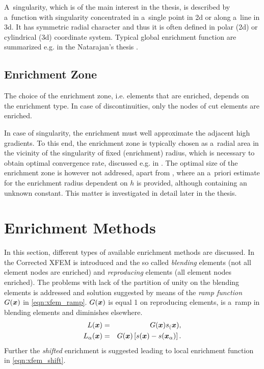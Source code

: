 A~singularity, which is of the main interest in the thesis, is described by a~function with singularity concentrated in a~single point in 2d
or along a~line in 3d. It has symmetric radial character and thus it is often defined in polar (2d) or cylindrical (3d) coordinate system.
Typical global enrichment function are summarized e.g. in the Natarajan's thesis \cite{natarajan_enriched_2011}.


\subsection{Enrichment Zone} \label{sec:glob_enr_zone}
The choice of the enrichment zone, i.e. elements that are enriched, depends on the enrichment type.
In case of discontinuities, only the nodes of cut elements are enriched.

In case of singularity, the enrichment must well approximate the adjacent high gradients.
To this end, the enrichment zone is typically chosen as a~radial area in the vicinity of the singularity
of fixed (enrichment) radius, which is necessary to obtain optimal convergence rate, discussed e.g. in \cite{fries_corrected_2008}.
The optimal size of the enrichment zone is however not addresed, apart from \cite{gupta_enr_zone_2016}, where
an a~priori estimate for the enrichment radius dependent on $h$ is provided, although containing an unknown constant.
This matter is investigated in detail later in the thesis.


 
\section{Enrichment Methods} \label{sec:enrichment_methods}
In this section, different types of available enrichment methods are discussed.
In \cite{fries_corrected_2008, fries_xfem_overview_2010} the Corrected XFEM is introduced
and the so called \emph{blending} elements (not all element nodes are enriched) and \emph{reproducing} elements
(all element nodes enriched). The problems with lack of the partition of unity on the blending elements is addressed
and solution suggested by means of the \emph{ramp function} $G(\mathbf{\boldsymbol{x}})$ in \eqref{eqn:xfem_ramp}.
$G(\mathbf{\boldsymbol{x}})$ is equal 1 on reproducing elements, is a~ramp in blending elements and diminishes elsewhere.
\begin{eqnarray} 
    L(\mathbf{\boldsymbol{x}}) &=& G(\mathbf{\boldsymbol{x}}) s_(\mathbf{\boldsymbol{x}}), \label{eqn:xfem_ramp}\\
    L_{\alpha}(\mathbf{\boldsymbol{x}}) &=& G(\mathbf{\boldsymbol{x}}) \left[s(\mathbf{\boldsymbol{x}}) - s(\mathbf{\boldsymbol{x}}_\alpha)\right]. \label{eqn:xfem_shift}
\end{eqnarray}
Further the \emph{shifted} enrichment is suggested leading to local enrichment function in \eqref{eqn:xfem_shift}.

